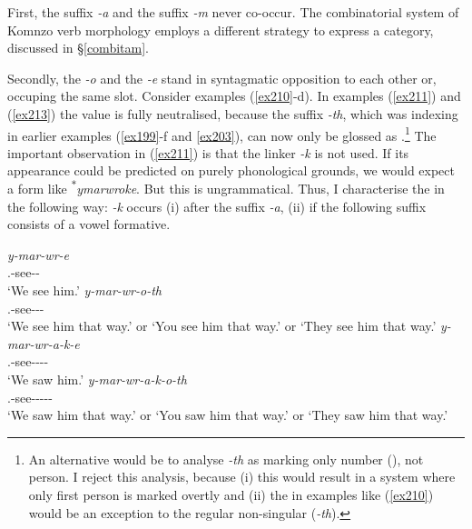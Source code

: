 First, the  suffix \emph{-a} and the  suffix \emph{-m} never co-occur. The combinatorial system of Komnzo verb morphology employs a different strategy to express a   category, discussed in {\S}\ref{combitam}.

Secondly, the  \emph{-o} and the {\Fnsg} \emph{-e} stand in syntagmatic opposition to each other or, occuping the same slot. Consider examples (\ref{ex210}-d). In examples (\ref{ex211}) and (\ref{ex213}) the  value is fully neutralised, because the suffix \emph{-th}, which was indexing \Stnsg{} in earlier examples (\ref{ex199}-f and \ref{ex203}), can now only be glossed as {\Nsg}.\footnote{An alternative would be to analyse \emph{-th} as marking only number (\Nsg), not person. I reject this analysis, because (i) this would result in a system where only first person is marked overtly and (ii) the {\Fnsg} in examples like (\ref{ex210}) would be an exception to the regular non-singular (\emph{-th}).} The important observation in (\ref{ex211}) is that the linker \emph{-k} is not used. If its appearance could be predicted on purely phonological grounds, we would expect a form like \textsuperscript{$\ast$}\emph{ymarwroke}. But this is ungrammatical. Thus, I characterise the  in the following way: \emph{-k} occurs (i) after the  suffix \emph{-a}, (ii) if the following suffix consists of a vowel formative.

\begin{exe}
\ex
\begin{xlist}
	\ex
	\gll \emph{y-mar-wr-e}\\
	\Tsg.\Masc-see-\Ndu-\Fnsg\\
	\trans `We see him.'
	\label{ex210}
	\ex
	\gll \emph{y-mar-wr-o-th}\\
	\Tsg.\Masc-see-\Ndu-\Andat-\Nsg\\
	\trans `We see him that way.' or `You see him that way.' or `They see him that way.'
	\label{ex211}
	\ex
	\gll \emph{y-mar-wr-a-k-e}\\
	\Tsg.\Masc-see-\Ndu-\Pst-\Lk-\Fnsg\\
	\trans `We saw him.'
	\label{ex212}
	\ex
	\gll \emph{y-mar-wr-a-k-o-th}\\
	\Tsg.\Masc-see-\Ndu-\Pst-\Lk-\Andat-\Nsg\\
	\trans `We saw him that way.' or `You saw him that way.' or `They saw him that way.'
	\label{ex213}
\end{xlist}
\end{exe}

